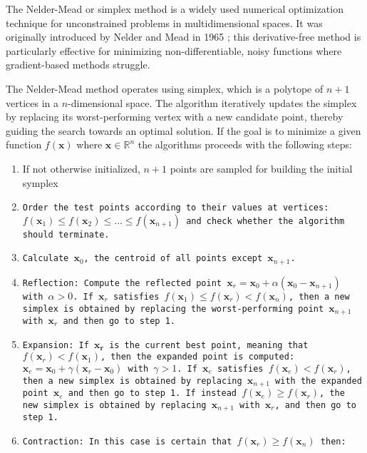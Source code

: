 The Nelder-Mead or simplex method is a widely used numerical optimization technique for unconstrained problems in multidimensional spaces. 
It was originally introduced by Nelder and Mead in 1965 \cite{NelderMeads}; this derivative-free method is particularly effective for minimizing non-differentiable, noisy functions where gradient-based methods struggle.


The Nelder-Mead method operates using simplex, which is a polytope of $n+1$ vertices in a $n$-dimensional space.
The algorithm iteratively updates the simplex by replacing its worst-performing vertex with a new candidate point, thereby guiding the search towards an optimal solution. 
If the goal is to minimize a given function $f(\mathbf{x})$ where $\mathbf{x} \in \mathbb{R}^n$ the algorithms proceeds with the following steps:\begin{enumerate}
    \item If not otherwise initialized, $n+1$ points are sampled for building the initial symplex
    \item \tt{Order} the test points according to their values at vertices: $f(\mathbf{x}_1) \leq f(\mathbf{x}_2) \leq \dots \leq f(\mathbf{x}_{n+1})$ and check whether the algorithm should terminate.
    \item \tt{Calculate} $\mathbf{x}_0$, the centroid of all points except $\mathbf{x}_{n+1}$.
    \item \tt{Reflection}: Compute the reflected point $\mathbf{x}_r = \mathbf{x}_0 + \alpha(\mathbf{x}_0 - \mathbf{x}_{n+1})$ with $\alpha > 0$. 
            If $\mathbf{x}_r$ satisfies $f(\mathbf{x}_1) \leq f(\mathbf{x}_r) < f(\mathbf{x}_n)$, then a new simplex is obtained by replacing the worst-performing point $\mathbf{x}_{n+1}$ with $\mathbf{x}_r$ and then go to step 1.
    \item \tt{Expansion}: If $\mathbf{x_r}$ is the current best point, meaning that $f(\mathbf{x}_r) < f(\mathbf{x}_1)$, then the expanded point is computed: $\mathbf{x}_e = \mathbf{x}_0 + \gamma(\mathbf{x}_r-\mathbf{x}_0)$ with $\gamma>1$.
           If $\mathbf{x}_e$ satisfies $f(\mathbf{x}_e) < f(\mathbf{x}_r)$, then a new simplex is obtained by replacing $\mathbf{x}_{n+1}$ with the expanded point $\mathbf{x}_e$ and then go to step 1.
            If instead $f(\mathbf{x}_e) \geq f(\mathbf{x}_r)$, the new simplex is obtained by replacing $\mathbf{x}_{n+1}$ with $\mathbf{x}_r$, and then go to step 1.
    \item \tt{Contraction}: In this case is certain that $f(\mathbf{x}_r) \geq f(\mathbf{x}_n)$ then:\begin{itemize}

\end{itemize}
\end{enumerate}
